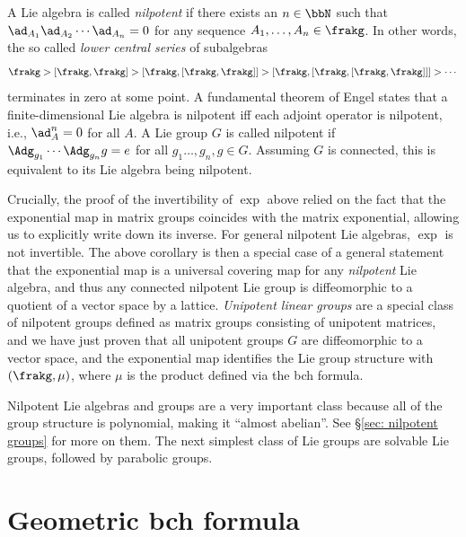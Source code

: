 \begin{rem}\label{rem nilpotent Lie alg}
    A Lie algebra is called \emph{nilpotent} if there exists an $n\in\bbN$ such that $\ad_{A_1}\ad_{A_2}\cdots \ad_{A_n}=0$ for any sequence $A_1,\ldots,A_n\in\frakg$. In other words, the so called \emph{lower central series} of subalgebras 
    \[\frakg>[\frakg,\frakg]>[\frakg,[\frakg,\frakg]]>[\frakg,[\frakg,[\frakg,\frakg]]]>\cdots\]
    terminates in zero at some point. A fundamental theorem of Engel states that a finite-dimensional Lie algebra is nilpotent iff each adjoint operator is nilpotent, i.e., $\ad_A^n=0$ for all $A$. A Lie group $G$ is called nilpotent if $\Adg_{g_1}\cdots \Adg_{g_n}g=e$ for all $g_1\ldots,g_n,g\in G$. Assuming $G$  is connected, this is equivalent to its Lie algebra being nilpotent. 
    
    Crucially, the proof of the invertibility of $\exp$ above relied on the fact that the exponential map in matrix groups coincides with the matrix exponential, allowing us to explicitly write down its inverse. For general nilpotent Lie algebras, $\exp$ is not invertible. The above corollary is then a special case of a general statement that the exponential map is a universal covering map for any \emph{nilpotent} Lie algebra, and thus any connected nilpotent Lie group is diffeomorphic to a quotient of a vector space by a lattice.  \emph{Unipotent linear groups} are a special class of nilpotent groups defined as matrix groups consisting of unipotent matrices, and we have just proven that all unipotent groups $G$ are diffeomorphic to a vector space, and the exponential map identifies the Lie group structure with $(\frakg,\mu)$, where $\mu$ is the product defined via the \gls{bch} formula.

    Nilpotent Lie algebras and groups are a very important class because all of the group structure is polynomial, making it ``almost abelian''. See \S\ref{sec: nilpotent groups} for more on them. The next simplest class of Lie groups are solvable Lie groups, followed by parabolic groups.
\end{rem}





\section{Geometric \texorpdfstring{\gls{bch}}{BCH} formula}

